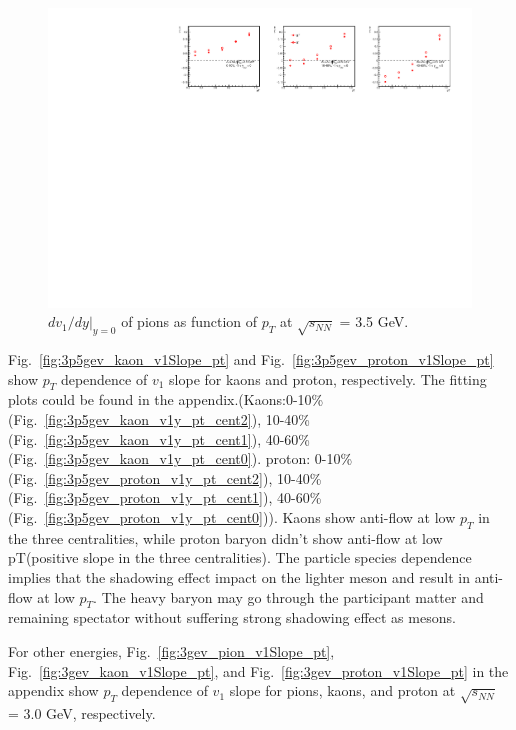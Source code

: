 \begin{figure}[hbt!]
\centering
\includegraphics[width=0.95\linewidth]{figures/chapter03/3p5gev_pionp_v1Slope_pT.pdf}
\caption{$dv_1/dy|_{y=0}$ of pions as function of $p_T$ at $\sqrt{s_{NN}}$ = 3.5 GeV.}
\label{fig:3p5gev_pion_v1Slope_pt}
\end{figure}

Fig.~\ref{fig:3p5gev_kaon_v1Slope_pt} and Fig.~\ref{fig:3p5gev_proton_v1Slope_pt} show $p_T$ dependence of $v_1$ slope for kaons and proton, respectively.
The fitting plots could be found in the appendix.(Kaons:0-10\%(Fig.~\ref{fig:3p5gev_kaon_v1y_pt_cent2}), 10-40\%(Fig.~\ref{fig:3p5gev_kaon_v1y_pt_cent1}), 40-60\%(Fig.~\ref{fig:3p5gev_kaon_v1y_pt_cent0}). proton: 0-10\%(Fig.~\ref{fig:3p5gev_proton_v1y_pt_cent2}), 10-40\%(Fig.~\ref{fig:3p5gev_proton_v1y_pt_cent1}), 40-60\%(Fig.~\ref{fig:3p5gev_proton_v1y_pt_cent0})).
Kaons show anti-flow at low $p_T$ in the three centralities, 
while proton baryon didn't show anti-flow at low pT(positive slope in the three centralities).
The particle species dependence implies that the shadowing effect impact on the lighter meson and result in anti-flow at low $p_T$. 
The heavy baryon may go through the participant matter and remaining spectator without suffering strong shadowing effect as mesons.

For other energies, Fig.~\ref{fig:3gev_pion_v1Slope_pt}, Fig.~\ref{fig:3gev_kaon_v1Slope_pt}, and Fig.~\ref{fig:3gev_proton_v1Slope_pt} in the appendix show $p_T$ dependence of $v_1$ slope for pions, kaons, and proton at $\sqrt{s_{NN}}$ = 3.0 GeV, respectively.


